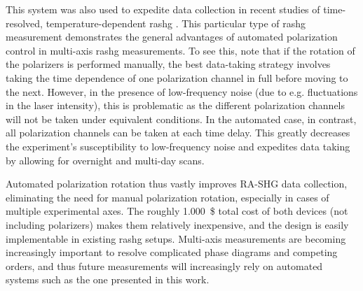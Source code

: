 This system was also used to expedite data collection in recent studies of time-resolved, temperature-dependent \gls{rashg} \citep{Fichera2023Light-inducedSemiconductor}.
This particular type of \gls{rashg} measurement demonstrates the general advantages of automated polarization control in multi-axis \gls{rashg} measurements.
To see this, note that if the rotation of the polarizers is performed manually, the best data-taking strategy involves taking the time dependence of one polarization channel in full before moving to the next. 
However, in the presence of low-frequency noise (due to e.g. fluctuations in the laser intensity), this is problematic as the different polarization channels will not be taken under equivalent conditions. 
In the automated case, in contrast, all polarization channels can be taken at each time delay. 
This greatly decreases the experiment's susceptibility to low-frequency noise and expedites data taking by allowing for overnight and multi-day scans.

Automated polarization rotation thus vastly improves RA-SHG data collection, eliminating the need for manual polarization rotation, especially in cases of multiple experimental axes. 
The roughly \qty{1,000}{\$} total cost of both devices (not including polarizers) makes them relatively inexpensive, and the design is easily implementable in existing \gls{rashg} setups.
Multi-axis measurements are becoming increasingly important to resolve complicated phase diagrams and competing orders, and thus future measurements will increasingly rely on automated systems such as the one presented in this work.
